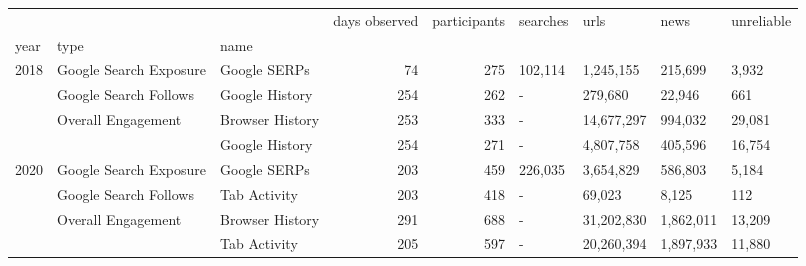 \begin{tabular}{lllrrllll}
 &  &  & days observed & participants & searches & urls & news & unreliable \\
year & type & name &  &  &  &  &  &  \\
\multirow[c]{4}{*}{2018} & Google Search Exposure & Google SERPs & 74 & 275 & 102,114 & 1,245,155 & 215,699 & 3,932 \\
 & Google Search Follows & Google History & 254 & 262 & - & 279,680 & 22,946 & 661 \\
 & \multirow[c]{2}{*}{Overall Engagement} & Browser History & 253 & 333 & - & 14,677,297 & 994,032 & 29,081 \\
 &  & Google History & 254 & 271 & - & 4,807,758 & 405,596 & 16,754 \\
\multirow[c]{4}{*}{2020} & Google Search Exposure & Google SERPs & 203 & 459 & 226,035 & 3,654,829 & 586,803 & 5,184 \\
 & Google Search Follows & Tab Activity & 203 & 418 & - & 69,023 & 8,125 & 112 \\
 & \multirow[c]{2}{*}{Overall Engagement} & Browser History & 291 & 688 & - & 31,202,830 & 1,862,011 & 13,209 \\
 &  & Tab Activity & 205 & 597 & - & 20,260,394 & 1,897,933 & 11,880 \\
\end{tabular}
